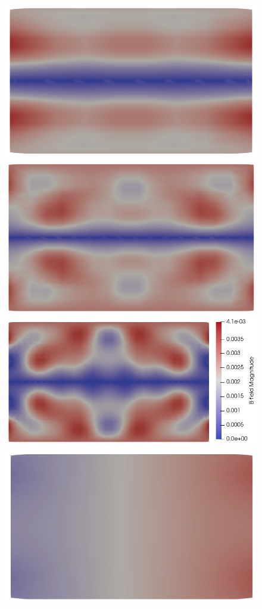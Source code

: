 \documentclass{article}
\begin{document}
\begin{figure}
    \includegraphics[scale=0.27]{clip_B_T-1_lambda-1e-1_8-2-2.png}
    \includegraphics[scale=0.27]{clip_B_T-1_lambda-1e-1_16-3-3.png}
    \includegraphics[scale=0.27]{clip_B_T-1_lambda-1e-1_32-3-4.png}
    \includegraphics[scale=0.27]{clip_ne_T-1_lambda-1e-1_8-2-2.png}

\end{figure}
\end{document}
